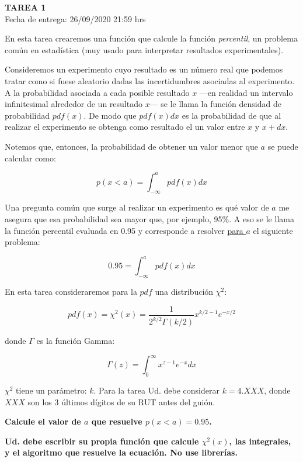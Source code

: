 \documentclass[letter, 11pt]{article}
\newcommand{\tareanro}{1}
\newcommand{\fechaentrega}{26/09/2020 21:59 hrs}
\begin{document}
\thispagestyle{firstpage}

\begin{center}
  {\uppercase{\LARGE \bf Tarea \tareanro}}\\
  Fecha de entrega: \fechaentrega
\end{center}



En esta tarea crearemos una función que calcule la función {\it percentil},
un problema común en estadística (muy usado para interpretar resultados
experimentales).

Consideremos un experimento cuyo resultado es un número real que podemos tratar
como si fuese aleatorio dadas las incertidumbres asociadas al experimento. A la
probabilidad asociada a cada posible resultado $x$ ---en realidad un intervalo
infinitesimal alrededor de un resultado $x$--- se le llama la función densidad
de probabilidad $pdf(x)$. De modo que $pdf(x) dx$ es la probabilidad de que al
realizar el experimento se obtenga como resultado el un valor entre $x$ y
$x+dx$.

Notemos que, entonces, la probabilidad de obtener un valor menor que $a$ se
puede calcular como:

$$p(x<a) = \int_{-\infty}^{a} pdf(x) dx $$

Una pregunta común que surge al realizar un experimento es qué valor de $a$ me
asegura que esa probabilidad sea mayor que, por ejemplo, 95\%. A eso se le
llama la función percentil evaluada en 0.95 y corresponde a resolver
\underline{para $a$} el siguiente problema:

$$ 0.95 = \int_{-\infty}^{a} pdf(x) dx $$

En esta tarea consideraremos para la $pdf$ una distribución $\chi^2$:

$$ pdf(x) = \chi^2(x) = \frac{1}{2^{k/2}\Gamma(k/2)} x^{k/2-1} e^{-x/2} $$

donde $\Gamma$ es la función Gamma:

$$ \Gamma(z) = \int_0^{\infty} x^{z-1}e^{-x}dx $$

$\chi^2$ tiene un parámetro: $k$. Para la tarea Ud. debe considerar $k=4.XXX$,
donde $XXX$ son los 3 últimos dígitos de su RUT antes del guión.

{\bf Calcule el valor de $a$ que resuelve $p(x<a) = 0.95$.}

{\bf Ud. debe escribir su propia función que calcule $\chi^2(x)$, las integrales, y
el algoritmo que resuelve la ecuación. No use librerías.}
\end{document}
